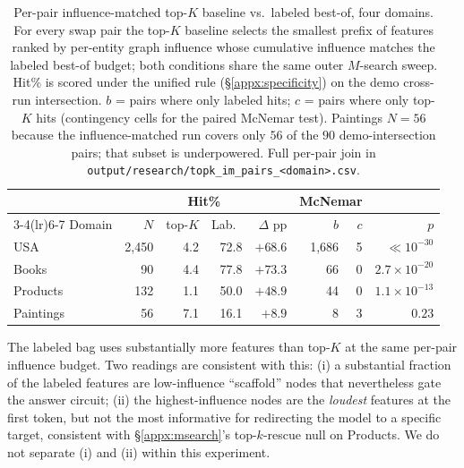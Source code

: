 \begin{table}[h]
\centering
\small
\caption{Per-pair influence-matched top-$K$ baseline vs.\ labeled best-of, four domains. For every swap pair the top-$K$ baseline selects the smallest prefix of features ranked by per-entity graph influence whose cumulative influence matches the labeled best-of budget; both conditions share the same outer $M$-search sweep. Hit\% is scored under the unified rule (\S\ref{appx:specificity}) on the demo cross-run intersection. $b$ = pairs where only labeled hits; $c$ = pairs where only top-$K$ hits (contingency cells for the paired McNemar test). Paintings $N{=}56$ because the influence-matched run covers only $56$ of the $90$ demo-intersection pairs; that subset is underpowered. Full per-pair join in \texttt{output/research/topk\_im\_pairs\_<domain>.csv}.}
\label{tab:topk-im}

\begin{tabular}{lrrrrrrr}
\toprule
& & \multicolumn{2}{c}{Hit\%} & & \multicolumn{2}{c}{McNemar} & \\
\cmidrule(lr){3-4}\cmidrule(lr){6-7}
Domain & $N$ & top-$K$ & Lab.\ & $\Delta$ pp & $b$ & $c$ & $p$ \\
\midrule
USA       & 2{,}450 &  4.2 & 72.8 & $+68.6$ & 1{,}686 &  5 & $\ll\!10^{-30}$ \\
Books     &      90 &  4.4 & 77.8 & $+73.3$ &      66 &  0 & $2.7\!\times\!10^{-20}$ \\
Products  &     132 &  1.1 & 50.0 & $+48.9$ &      44 &  0 & $1.1\!\times\!10^{-13}$ \\
Paintings &      56 &  7.1 & 16.1 & $+8.9$  &       8 &  3 & $0.23$ \\
\bottomrule
\end{tabular}
\end{table}

The labeled bag uses substantially more features than top-$K$ at the same per-pair influence budget. Two readings are consistent with this: (i) a substantial fraction of the labeled features are low-influence ``scaffold'' nodes that nevertheless gate the answer circuit; (ii) the highest-influence nodes are the \emph{loudest} features at the first token, but not the most informative for redirecting the model to a specific target, consistent with \S\ref{appx:msearch}'s top-$k$-rescue null on Products. We do not separate (i) and (ii) within this experiment.



